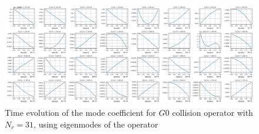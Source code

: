 \documentclass{article}
\begin{document}
\begin{figure}[!tbhp]
	\includegraphics[width=\textwidth]{fig/g0_Nr_31_coeff_vs_time_1.00E+00_NI_1.00E+18_N0_3.22E+22_NE_1.00E+18.png}
	\caption{Time evolution of the mode coefficient for $G0$ collision operator with $N_r=31$, using eigenmodes of the operator\label{fig:g0_nr31}}
\end{figure}

\end{document}

